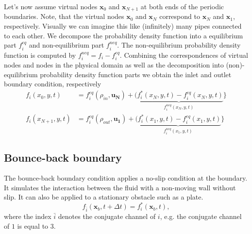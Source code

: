 \documentclass[a4paper,11pt, footsepline]{book}
\begin{document}
Let's now assume virtual nodes $\mathbf{x}_{0}$ and $\mathbf{x}_{N+1}$ at both ends of the periodic boundaries. Note, that the virtual nodes $\mathbf{x}_{0}$ and $\mathbf{x}_{N}$ correspond to $\mathbf{x}_{N}$ and $\mathbf{x}_{1}$, respectively. Visually we can imagine this like (infinitely) many pipes connected to each other. We decompose the probability density function into a equilibrium part $f_{i}^{eq}$ and non-equilibrium part $f_{i}^{neq}$. The non-equilibrium probability density function is computed by $f_{i}^{neq}=f_{i}-f_{i}^{eq}$. Combining the correspondences of virtual nodes and nodes in the physical domain as well as the decomposition into (non)-equilibrium probability density function parts we obtain the inlet and outlet boundary condition, respectively
\begin{align}
f_{i}(x_0,y,t)&=f_{i}^{eq}(\rho_{in},\mathbf{u_N})+\underbrace{(f_{i}^{\ast}(x_N,y,t)-f_{i}^{eq}(x_N,y,t)}_{f_i^{neq}(x_N,y,t)}\rbrace\\
f_{i}(x_{N+1},y,t)&=f_{i}^{eq}(\rho_{out},\mathbf{u_1})+\underbrace{(f_{i}^{\ast}(x_1,y,t)-f_{i}^{eq}(x_1,y,t)}_{f_i^{neq}(x_1,y,t)}\rbrace
\end{align}
\subsection*{Bounce-back boundary}
The bounce-back boundary condition applies a no-slip condition at the boundary. It simulates the interaction between the fluid with a non-moving wall without slip. It can also be applied to a stationary obstacle such as a plate.
\begin{equation}
f_{\bar{i}}(\mathbf{x}_{b},t+\Delta t)=f_{i}^{\ast}(\mathbf{x}_{b},t),
\end{equation}
where the index $\bar{i}$ denotes the conjugate channel of $i$, e.g. the conjugate channel of $1$ is equal to $3$.
\end{document}
